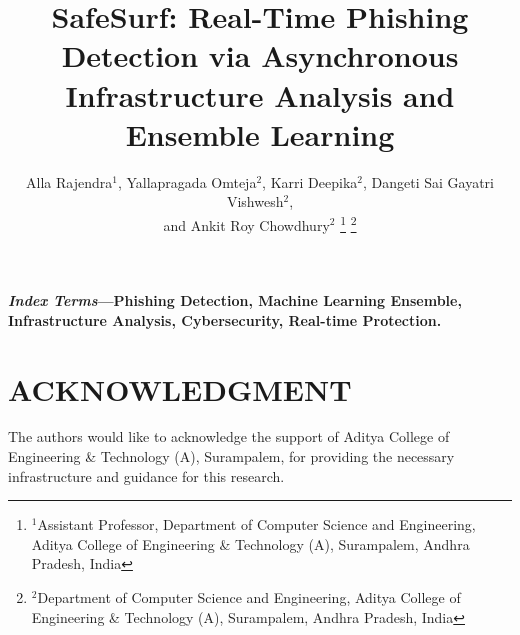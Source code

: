 \documentclass[a4paper, 10pt, conference]{ieeeconf}
\title{\LARGE \bf
SafeSurf: Real-Time Phishing Detection via Asynchronous Infrastructure Analysis and Ensemble Learning}
\author{
Alla Rajendra$^{1}$, 
Yallapragada Omteja$^{2}$, 
Karri Deepika$^{2}$, 
Dangeti Sai Gayatri Vishwesh$^{2}$,\\ 
and Ankit Roy Chowdhury$^{2}$
\thanks{$^{1}$Assistant Professor, Department of Computer Science and Engineering, Aditya College of Engineering \& Technology (A), Surampalem, Andhra Pradesh, India}
\thanks{$^{2}$Department of Computer Science and Engineering, Aditya College of Engineering \& Technology (A), Surampalem, Andhra Pradesh, India}
}
\begin{document}
\maketitle
\thispagestyle{empty}
\pagestyle{empty}

\begin{abstract}

\end{abstract}

\vspace{3pt}
\noindent\textbf{\textit{Index Terms}---Phishing Detection, Machine Learning Ensemble, Infrastructure Analysis, Cybersecurity, Real-time Protection.}







\section*{ACKNOWLEDGMENT}
The authors would like to acknowledge the support of Aditya College of Engineering \& Technology (A), Surampalem, for providing the necessary infrastructure and guidance for this research.



\end{document}
